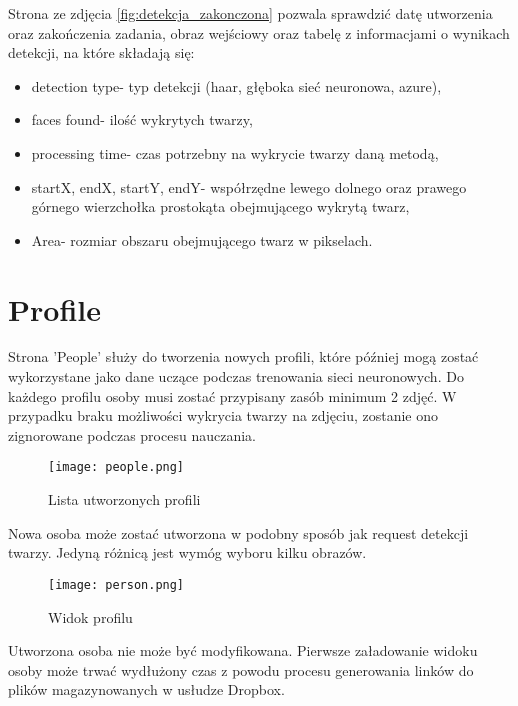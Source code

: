 \pagebreak

Strona ze zdjęcia \ref{fig:detekcja_zakonczona} pozwala sprawdzić datę utworzenia oraz zakończenia zadania, obraz wejściowy oraz tabelę z informacjami o wynikach detekcji, na które składają się:
\begin{itemize}
\item detection type- typ detekcji (haar, głęboka sieć neuronowa, azure),
\item faces found- ilość wykrytych twarzy,
\item processing time- czas potrzebny na wykrycie twarzy daną metodą,
\item startX, endX, startY, endY- współrzędne lewego dolnego oraz prawego górnego wierzchołka prostokąta obejmującego wykrytą twarz,
\item Area- rozmiar obszaru obejmującego twarz w pikselach.
\end{itemize}

\section{Profile}
Strona 'People' służy do tworzenia nowych profili, które później mogą zostać wykorzystane jako dane uczące podczas trenowania sieci neuronowych. Do każdego profilu osoby musi zostać przypisany zasób minimum 2 zdjęć. W przypadku braku możliwości wykrycia twarzy na zdjęciu, zostanie ono zignorowane podczas procesu nauczania.
\begin{figure}[H]
	\centering
	\texttt{[image: people.png]}
	\caption{Lista utworzonych profili}
	\label{fig:people}
\end{figure}
Nowa osoba może zostać utworzona w podobny sposób jak request detekcji twarzy. Jedyną różnicą jest wymóg wyboru kilku obrazów.
\begin{figure}[H]
	\centering
	\texttt{[image: person.png]}
	\caption{Widok profilu}
	\label{fig:person}
\end{figure}
Utworzona osoba nie może być modyfikowana. Pierwsze załadowanie widoku osoby może trwać wydłużony czas z powodu procesu generowania linków do plików magazynowanych w usłudze Dropbox.

